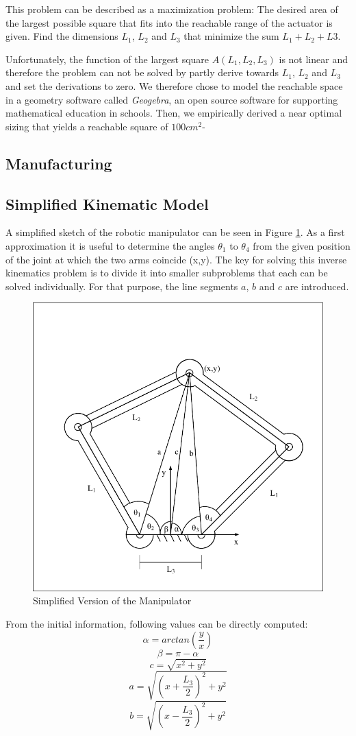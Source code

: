\documentclass{sig-alternate-05-2015}
\begin{document}
This problem can be described as a maximization problem:
 The desired area of the largest possible square that fits into the reachable range of the actuator is given. Find the dimensions $L_1$, $L_2$ and $L_3$ that minimize the sum $L_1 + L_2 +L3$.
 
 Unfortunately, the function of the largest square $A(L_1, L_2, L_3)$ is not linear and therefore the problem can not be solved by partly derive towards $L_1$, $L_2$ and $L_3$ and set the derivations to zero. 
 We therefore chose to model the reachable space in a geometry software called \emph{Geogebra}, an open source software for supporting mathematical education in schools. Then, we empirically derived a near optimal sizing that yields a reachable square of $100 cm^2$-
\subsection{Manufacturing}
\subsection{Simplified Kinematic Model}\label{section1}

A simplified sketch of the robotic manipulator can be seen in Figure \ref{fig:model}.
As a first approximation it is useful to determine the angles $\theta_1$ to $\theta_4$ from the given position of the joint at which the two arms coincide (x,y). The key for solving this inverse kinematics problem is to divide it into smaller subproblems that each can be solved individually. For that purpose, the line segments $a$, $b$ and $c$ are introduced.
\begin{figure}[!h]
	\label{fig:model}
	\centering
	\includegraphics[width=.42\textwidth]{LinkDiagramSimple_try.pdf}
	\caption{Simplified Version of the Manipulator}
\end{figure}

From the initial information, following values can be directly computed:
\begin{equation}
\alpha = arctan \left( \frac{y}{x} \right)
\end{equation}
\begin{equation}
\beta = \pi - \alpha
\end{equation}
\begin{equation}
c = \sqrt{x^2 + y^2}
\end{equation}
\begin{equation}
a = \sqrt{\left(x+ \frac{L_3}{2}\right)^2 + y^2}
\end{equation}
\begin{equation}
b = \sqrt{\left(x- \frac{L_3}{2}\right)^2 + y^2}
\end{equation}
\end{document}
